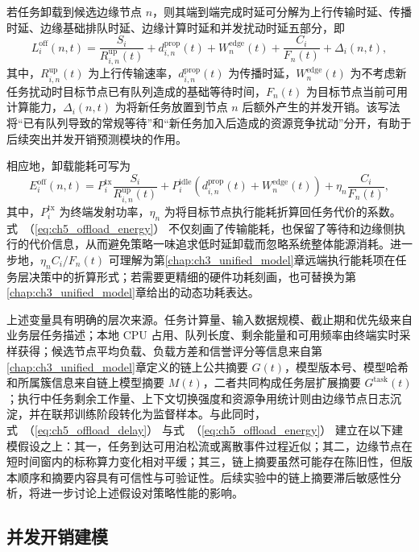 若任务卸载到候选边缘节点 $n$，则其端到端完成时延可分解为上行传输时延、传播时延、边缘基础排队时延、边缘计算时延和并发扰动时延五部分，即
\begin{equation}
    L_i^{\mathrm{off}}(n,t) = \frac{S_i}{R_{i,n}^{\mathrm{up}}(t)} + d_{i,n}^{\mathrm{prop}}(t)
    + W_{n}^{\mathrm{edge}}(t) + \frac{C_i}{F_n(t)} + \Delta_i(n,t),
    \label{eq:ch5_offload_delay}
\end{equation}
其中，$R_{i,n}^{\mathrm{up}}(t)$ 为上行传输速率，$d_{i,n}^{\mathrm{prop}}(t)$ 为传播时延，$W_{n}^{\mathrm{edge}}(t)$ 为不考虑新任务扰动时目标节点已有队列造成的基础等待时间，$F_n(t)$ 为目标节点当前可用计算能力，$\Delta_i(n,t)$ 为将新任务放置到节点 $n$ 后额外产生的并发开销。该写法将“已有队列导致的常规等待”和“新任务加入后造成的资源竞争扰动”分开，有助于后续突出并发开销预测模块的作用。

相应地，卸载能耗可写为
\begin{equation}
    E_i^{\mathrm{off}}(n,t) = P_i^{\mathrm{tx}}\frac{S_i}{R_{i,n}^{\mathrm{up}}(t)}
    + P_i^{\mathrm{idle}}\left(d_{i,n}^{\mathrm{prop}}(t)+W_{n}^{\mathrm{edge}}(t)\right)
    + \eta_n \frac{C_i}{F_n(t)},
    \label{eq:ch5_offload_energy}
\end{equation}
其中，$P_i^{\mathrm{tx}}$ 为终端发射功率，$\eta_n$ 为将目标节点执行能耗折算回任务代价的系数。式~（\ref{eq:ch5_offload_energy}） 不仅刻画了传输能耗，也保留了等待和边缘侧执行的代价信息，从而避免策略一味追求低时延卸载而忽略系统整体能源消耗。进一步地，$\eta_n C_i/F_n(t)$ 可理解为第\ref{chap:ch3_unified_model}章远端执行能耗项在任务层决策中的折算形式；若需要更精细的硬件功耗刻画，也可替换为第\ref{chap:ch3_unified_model}章给出的动态功耗表达。

上述变量具有明确的层次来源。任务计算量、输入数据规模、截止期和优先级来自业务层任务描述；本地 CPU 占用、队列长度、剩余能量和可用频率由终端实时采样获得；候选节点平均负载、负载方差和信誉评分等信息来自第\ref{chap:ch3_unified_model}章定义的链上公共摘要 $G(t)$，模型版本号、模型哈希和所属簇信息来自链上模型摘要 $M(t)$，二者共同构成任务层扩展摘要 $G^{\mathrm{task}}(t)$；执行中任务剩余工作量、上下文切换强度和资源争用统计则由边缘节点日志沉淀，并在联邦训练阶段转化为监督样本。与此同时，式~（\ref{eq:ch5_offload_delay}） 与式~（\ref{eq:ch5_offload_energy}） 建立在以下建模假设之上：其一，任务到达可用泊松流或离散事件过程近似；其二，边缘节点在短时间窗内的标称算力变化相对平缓；其三，链上摘要虽然可能存在陈旧性，但版本顺序和摘要内容具有可信性与可验证性。后续实验中的链上摘要滞后敏感性分析，将进一步讨论上述假设对策略性能的影响。

\subsection{并发开销建模}

